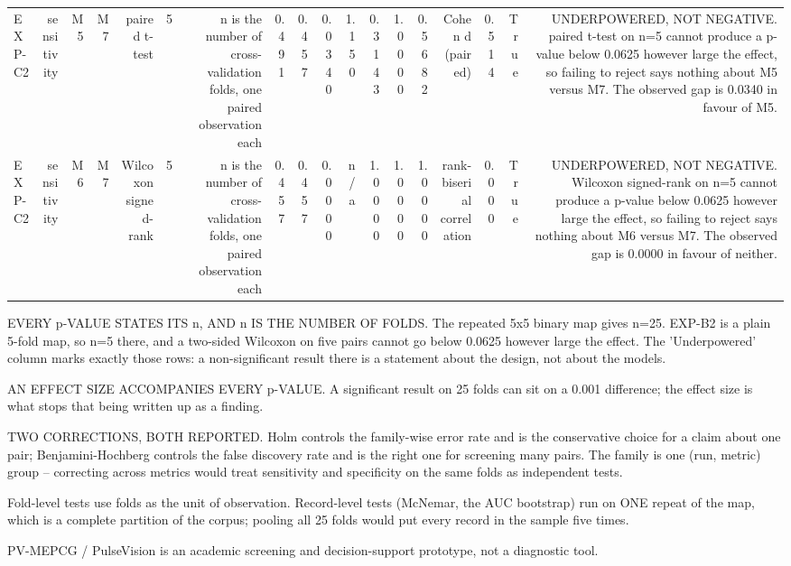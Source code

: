 \begin{table}[htbp]
\begin{tabular}{lrrrrrrrrrrrrrrrrr}
    EXP-C2 & sensitivity & M5 & M7 & paired t-test & 5 & n is the number of cross-validation folds, one paired observation each & 0.491 & 0.457 & 0.0340 & 1.150 & 0.3143 & 1.0000 & 0.5682 & Cohen d (paired) & 0.514 & True & UNDERPOWERED, NOT NEGATIVE. paired t-test on n=5 cannot produce a p-value below 0.0625 however large the effect, so failing to reject says nothing about M5 versus M7. The observed gap is 0.0340 in favour of M5. \\
    EXP-C2 & sensitivity & M6 & M7 & Wilcoxon signed-rank & 5 & n is the number of cross-validation folds, one paired observation each & 0.457 & 0.457 & 0.0000 & n/a & 1.0000 & 1.0000 & 1.0000 & rank-biserial correlation & 0.000 & True & UNDERPOWERED, NOT NEGATIVE. Wilcoxon signed-rank on n=5 cannot produce a p-value below 0.0625 however large the effect, so failing to reject says nothing about M6 versus M7. The observed gap is 0.0000 in favour of neither. \\
    \bottomrule
  \end{tabular}
  \par\footnotesize EVERY p-VALUE STATES ITS n, AND n IS THE NUMBER OF FOLDS. The repeated 5x5 binary map gives n=25. EXP-B2 is a plain 5-fold map, so n=5 there, and a two-sided Wilcoxon on five pairs cannot go below 0.0625 however large the effect. The 'Underpowered' column marks exactly those rows: a non-significant result there is a statement about the design, not about the models.
  \par\footnotesize AN EFFECT SIZE ACCOMPANIES EVERY p-VALUE. A significant result on 25 folds can sit on a 0.001 difference; the effect size is what stops that being written up as a finding.
  \par\footnotesize TWO CORRECTIONS, BOTH REPORTED. Holm controls the family-wise error rate and is the conservative choice for a claim about one pair; Benjamini-Hochberg controls the false discovery rate and is the right one for screening many pairs. The family is one (run, metric) group -- correcting across metrics would treat sensitivity and specificity on the same folds as independent tests.
  \par\footnotesize Fold-level tests use folds as the unit of observation. Record-level tests (McNemar, the AUC bootstrap) run on ONE repeat of the map, which is a complete partition of the corpus; pooling all 25 folds would put every record in the sample five times.
  \par\footnotesize PV-MEPCG / PulseVision is an academic screening and decision-support prototype, not a diagnostic tool.
\end{table}
